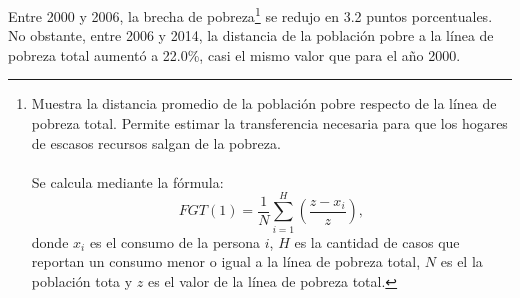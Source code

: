 Entre 2000 y 2006, la brecha de pobreza\footnote{Muestra la distancia promedio de la población pobre respecto de  la línea de pobreza total. Permite estimar la transferencia necesaria para  que los hogares de escasos recursos salgan de la  pobreza. \\\\ Se calcula mediante la fórmula: 
\[ FGT(1) = \frac {1} {N} \sum_{i=1}^H \left(\frac {z-x_i} {z}\right),   \] donde $x_i$ es el consumo de la persona $i$, $H$ es  la cantidad de casos que reportan un consumo menor  o igual a la línea de pobreza total, $N$ es el la población tota y $z$ es el valor de la línea de pobreza total.   } se redujo en 3.2 puntos porcentuales. No obstante, entre 2006 y 2014, la distancia de la población pobre a la línea de pobreza total aumentó a 22.0\%, casi el mismo valor  que para el año 2000.